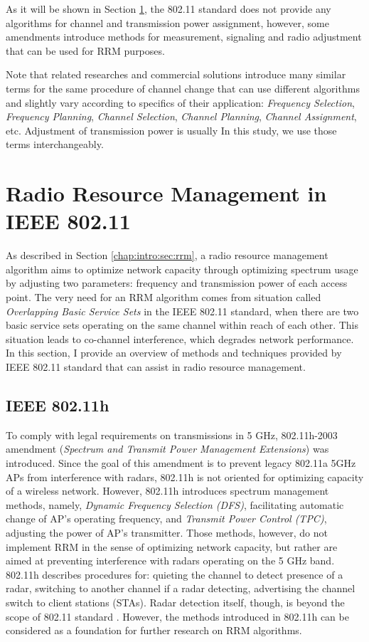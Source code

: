 As it will be shown in Section \ref{chap:lr:sec:rrm_80211}, the 802.11 standard does not provide any algorithms for channel and transmission power assignment, however, some amendments introduce methods for measurement, signaling and radio adjustment that can be used for RRM purposes.

Note that related researches and commercial solutions introduce many similar terms for the same procedure of channel change that can use different algorithms and slightly vary according to specifics of their application: \textit{Frequency Selection}, \textit{Frequency Planning}, \textit{Channel Selection}, \textit{Channel Planning}, \textit{Channel Assignment}, etc. Adjustment of transmission power is usually
In this study, we use those terms interchangeably.

\section {Radio Resource Management in IEEE 802.11}
\label{chap:lr:sec:rrm_80211}
As described in Section \ref{chap:intro:sec:rrm}, a radio resource management algorithm aims to optimize network capacity through optimizing spectrum usage by adjusting two parameters: frequency and transmission power of each access point. The very need for an RRM algorithm comes from situation called \textit{Overlapping Basic Service Sets} in the IEEE 802.11 standard, when there are two basic service sets operating on the same channel within reach of each other. This situation leads to co-channel interference, which degrades network performance. In this section, I provide an overview of methods and techniques provided by IEEE 802.11 standard that can assist in radio resource management.


\subsection {IEEE 802.11h}
\label{chap:lr:sec:80211h}
To comply with legal requirements on transmissions in 5 GHz, 802.11h-2003 \cite{80211h} amendment (\textit{Spectrum and Transmit Power Management Extensions}) was introduced. Since the goal of this amendment is to prevent legacy 802.11a 5GHz APs from interference with radars, 802.11h is not oriented for optimizing capacity of a wireless network. However, 802.11h introduces \cite{konsgenSpectrumManagementAlgorithms2010} spectrum management methods, namely, \textit{Dynamic Frequency Selection (DFS)}, facilitating automatic change of AP's operating frequency, and \textit{Transmit Power Control (TPC)}, adjusting the power of AP's transmitter.
Those methods, however, do not implement RRM in the sense of optimizing network capacity, but rather are aimed at preventing interference with radars operating on the 5 GHz band. 802.11h describes procedures for: quieting the channel to detect presence of a radar, switching to another channel if a radar detecting, advertising the channel switch to client stations (STAs). Radar detection itself, though, is beyond the scope of 802.11 standard \cite{80211h}.
However, the methods introduced in 802.11h can be considered as a foundation for further research on RRM algorithms.


